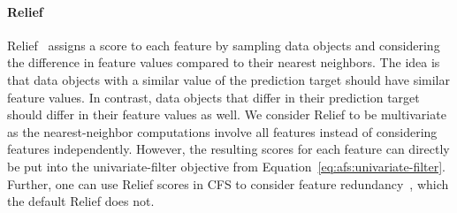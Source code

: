\documentclass{article}
\theoremstyle{definition}
\begin{document}
\paragraph{Relief}

Relief~\cite{kira1992feature, robnik1997adaptation} assigns a score to each feature by sampling data objects and considering the difference in feature values compared to their nearest neighbors.
The idea is that data objects with a similar value of the prediction target should have similar feature values.
In contrast, data objects that differ in their prediction target should differ in their feature values as well.
We consider Relief to be multivariate as the nearest-neighbor computations involve all features instead of considering features independently.
However, the resulting scores for each feature can directly be put into the univariate-filter objective from Equation~\ref{eq:afs:univariate-filter}.
Further, one can use Relief scores in CFS to consider feature redundancy~\cite{hall1999correlation, hall2000correlation}, which the default Relief does not.

\renewcommand*{\bibfont}{\small} %
\printbibliography
\end{document}
